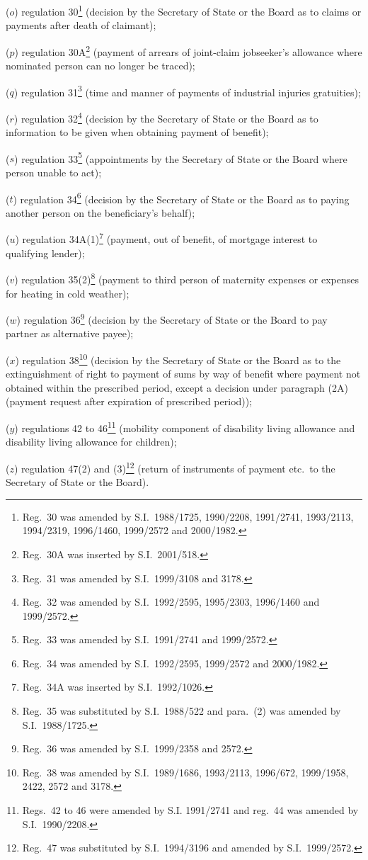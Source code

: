 \documentclass[12pt,a4paper]{article}
\begin{document}
\begin{enumerate}
($o$) regulation 30\footnote{Reg.~30 was amended by S.I.~1988/1725, 1990/\hspace{0pt}2208, 1991/2741, 1993/2113, 1994/2319, 1996/1460, 1999/2572 and 2000/1982.} (decision by the Secretary of State or the Board as to claims or payments after death of claimant);

($p$) regulation 30A\footnote{Reg.~30A was inserted by S.I.~2001/518.} (payment of arrears of joint-claim jobseeker’s allowance where nominated person can no longer be traced);

($q$) regulation 31\footnote{Reg.~31 was amended by S.I.~1999/3108 and 3178.} (time and manner of payments of industrial injuries gratuities);%

($r$) regulation 32\footnote{Reg.~32 was amended by S.I.~1992/2595, 1995/2303, 1996/1460 and 1999/2572.} (decision by the Secretary of State or the Board as to information to be given when obtaining payment of benefit);

($s$) regulation 33\footnote{Reg.~33 was amended by S.I.~1991/2741 and 1999/2572.} (appointments by the Secretary of State or the Board where person unable to act);

($t$) regulation 34\footnote{Reg.~34 was amended by S.I.~1992/2595, 1999/2572 and 2000/1982.} (decision by the Secretary of State or the Board as to paying another person on the beneficiary’s behalf);

($u$) regulation 34A(1)\footnote{Reg.~34A was inserted by S.I.~1992/1026.} (payment, out of benefit, of mortgage interest to qualifying lender);

($v$) regulation 35(2)\footnote{Reg.~35 was substituted by S.I.~1988/522 and para.~(2) was amended by S.I.~1988/1725.} (payment to third person of maternity expenses or expenses for heating in cold weather);

($w$) regulation 36\footnote{Reg.~36 was amended by S.I.~1999/2358 and 2572.} (decision by the Secretary of State or the Board to pay partner as alternative payee);

($x$) regulation 38\footnote{Reg.~38 was amended by S.I.~1989/1686, 1993/2113, 1996/672, 1999/1958, 2422, 2572 and 3178.} (decision by the Secretary of State or the Board as to the extinguishment of right to payment of sums by way of benefit where payment not obtained within the prescribed period, except a decision under paragraph (2A) (payment request after expiration of prescribed period));

($y$) regulations 42 to 46\footnote{Regs.~42 to 46 were amended by S.I. 1991/2741 and reg.~44 was amended by S.I.~1990/2208.} (mobility component of disability living allowance and disability living allowance for children);

($z$) regulation 47(2) and (3)\footnote{Reg.~47 was substituted by S.I.~1994/3196 and amended by S.I.~1999/2572.} (return of instruments of payment etc.\ to the Secretary of State or the Board).
\end{enumerate}
\end{document}
